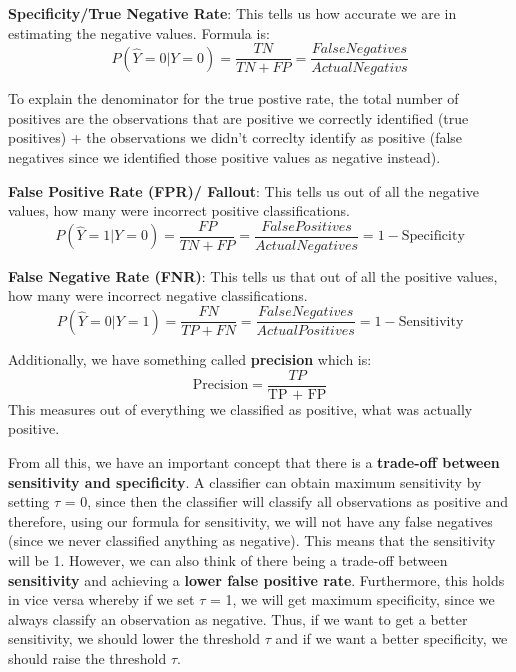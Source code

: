 \documentclass[11pt, oneside]{article}
\theoremstyle{definition}
\begin{document}
\textbf{Specificity/True Negative Rate}: This tells us how accurate we are in estimating the negative values. Formula is:
\begin{equation}
  P(\hat{Y} = 0 |Y = 0) = \frac{TN}{TN + FP} = \frac{False Negatives}{Actual Negativs}
  \end{equation}

  To explain the denominator for the true postive rate, the total number of positives are the observations that are positive we correctly identified (true positives) + the observations we didn't correclty identify as positive (false negatives since we identified those positive values as negative instead).

  \textbf{False Positive Rate (FPR)/ Fallout}: This tells us out of all the negative values, how many were incorrect positive classifications.
  \begin{equation}
    P(\hat{Y} = 1 |Y = 0) = \frac{FP}{TN + FP} = \frac{False Positives}{Actual Negatives} = 1 - \text{Specificity}
    \end{equation}

  \textbf{False Negative Rate (FNR)}: This tells us that out of all the positive values, how many were incorrect negative classifications.
  \begin{equation}
    P(\hat{Y} = 0 |Y = 1) = \frac{FN}{TP + FN} = \frac{False Negatives}{Actual Positives} = 1 - \text{Sensitivity}
    \end{equation}

Additionally, we have something called \textbf{precision} which is:
$$
\text{Precision} = \frac{TP}{\text{TP + FP}}
$$
This measures out of everything we classified as positive, what was actually positive.


From all this, we have an important concept that there is a \textbf{trade-off between sensitivity and specificity}. A classifier can obtain maximum sensitivity by setting $\tau$ = 0, since then the classifier will classify all observations as positive and therefore, using our formula for sensitivity, we will not have any false negatives (since we never classified anything as negative). This means that the sensitivity will be 1. However, we can also think of there being a trade-off between \textbf{sensitivity} and achieving a \textbf{lower false positive rate}. Furthermore, this holds in vice versa whereby if we set $\tau$ = 1, we will get maximum specificity, since we always classify an observation as negative. Thus, if we want to get a better sensitivity, we should lower the threshold $\tau$ and if we want a better specificity, we should raise the threshold $\tau$.
\end{document}
